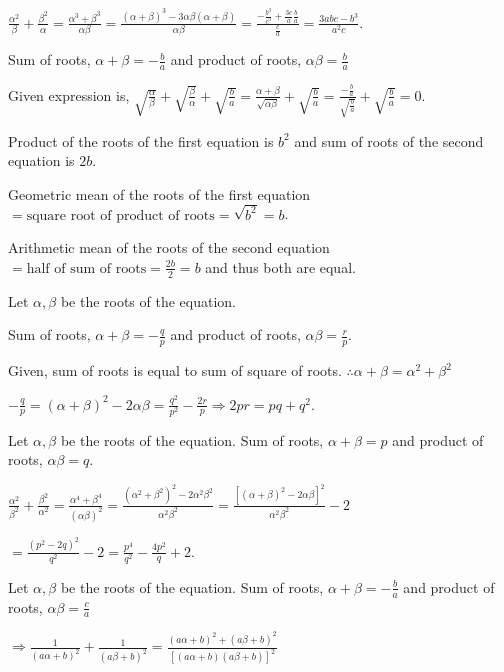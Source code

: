  $\frac{\alpha^2}{\beta} + \frac{\beta^2}{\alpha} = \frac{\alpha^3 + \beta^3}{\alpha\beta} =
  \frac{(\alpha + \beta)^3 - 3\alpha\beta(\alpha + \beta)}{\alpha\beta} = \frac{-\frac{b^3}{c^3} +
    \frac{3c}{a}\frac{b}{a}}{\frac{c}{a}} = \frac{3abc - b^3}{a^2c}$.
\item Sum of roots, $\alpha + \beta = -\frac{b}{a}$ and product of roots, $\alpha\beta = \frac{b}{a}$

  Given expression is, $\sqrt{\frac{\alpha}{\beta}} + \sqrt{\frac{\beta}{\alpha}} + \sqrt{\frac{b}{a}} =
  \frac{\alpha + \beta}{\sqrt{\alpha\beta}} + \sqrt{\frac{b}{a}} =
  \frac{-\frac{b}{a}}{\sqrt{\frac{b}{a}}} + \sqrt{\frac{b}{a}} = 0$.
\item Product of the roots of the first equation is $ b^2$ and sum of roots of the second equation is $2b$.

  Geometric mean of the roots of the first equation $= \text{square root of product of roots} = \sqrt{b^2} =
  b$.

  Arithmetic mean of the roots of the second equation $= \text{half of sum of roots} = \frac{2b}{2} = b$ and
  thus both are equal.
\item Let $\alpha, \beta$ be the roots of the equation.

  Sum of roots, $\alpha + \beta = -\frac{q}{p}$ and product of roots, $\alpha\beta = \frac{r}{p}$.

  Given, sum of roots is equal to sum of square of roots. $\therefore \alpha + \beta = \alpha^2 + \beta^2$

  $-\frac{q}{p} = (\alpha + \beta)^2 - 2\alpha\beta = \frac{q^2}{p^2} - \frac{2r}{p}\Rightarrow 2pr = pq +
  q^2$.
\item Let $\alpha, \beta$ be the roots of the equation. Sum of roots, $\alpha + \beta = p$ and product of
  roots, $\alpha\beta = q$.

  $\frac{\alpha^2}{\beta^2} + \frac{\beta^2}{\alpha^2} = \frac{\alpha^4 + \beta^4}{(\alpha\beta)^2} =
  \frac{(\alpha^2 + \beta^2)^2 - 2\alpha^2\beta^2}{\alpha^2\beta^2} = \frac{[(\alpha + \beta)^2 -
      2\alpha\beta]^2}{\alpha^2\beta^2} - 2$

  $= \frac{(p^2 - 2q)^2}{q^2} - 2 = \frac{p^4}{q^2} - \frac{4p^2}{q} + 2$.
\item Let $\alpha, \beta$ be the roots of the equation. Sum of roots, $\alpha + \beta = -\frac{b}{a}$ and
  product of roots, $\alpha\beta = \frac{c}{a}$

  $\Rightarrow \frac{1}{(a\alpha + b)^2} + \frac{1}{(a\beta + b)^2} = \frac{(a\alpha + b)^2 + (a\beta +
    b)^2}{[(a\alpha + b)(a\beta + b)]^2}$

